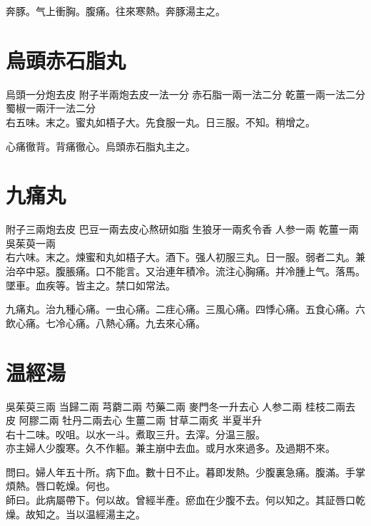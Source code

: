 奔豚。气上衝胸。腹痛。往來寒熱。奔豚湯主之。

\section{烏頭赤石脂丸}

烏頭{\scriptsize 一分炮去皮} 附子{\scriptsize 半兩炮去皮一法一分} 赤石脂{\scriptsize 一兩一法二分} 乾薑{\scriptsize 一兩一法二分} 蜀椒{\scriptsize 一兩汗一法二分}\\
右五味。末之。蜜丸如梧子大。先食服一丸。日三服。不知。稍增之。

心痛徹背。背痛徹心。烏頭赤石脂丸主之。

\section{九痛丸}

附子{\scriptsize 三兩炮去皮} 巴豆{\scriptsize 一兩去皮心熬研如脂} 生狼牙{\scriptsize 一兩炙令香} 人参{\scriptsize 一兩} 乾薑{\scriptsize 一兩} 吳茱萸{\scriptsize 一兩}\\
右六味。末之。煉蜜和丸如梧子大。酒下。强人初服三丸。日一服。弱者二丸。兼治卒中惡。腹脹痛。口不能言。又治連年積冷。流注心胸痛。并冷腫上气。落馬。墜車。血疾等。皆主之。禁口如常法。{\wuben}

{\dengben}%

九痛丸。治九種心痛。{\khaaitp 一虫心痛。二疰心痛。三風心痛。四悸心痛。五食心痛。六飲心痛。七冷心痛。八熱心痛。九去來心痛。}

\section{温經湯}

吳茱萸{\scriptsize 三兩} 当歸{\scriptsize 二兩} 芎藭{\scriptsize 二兩} 芍藥{\scriptsize 二兩} 麥門冬{\scriptsize 一升去心} 人参{\scriptsize 二兩} 桂枝{\scriptsize 二兩去皮} 阿膠{\scriptsize 二兩} 牡丹{\scriptsize 二兩去心} 生薑{\scriptsize 二兩} 甘草{\scriptsize 二兩炙} 半夏{\scriptsize 半升}\\
右十二味。㕮咀。以水一斗。煮取三升。去滓。分温三服。\\
亦主婦人少腹寒。久不作軀。兼主崩中去血。或月水來過多。及過期不來。

問曰。婦人年五十所。病下血。數十日不止。暮即发熱。少腹裏急{\khaaitp 痛}。腹滿。手掌煩熱。唇口乾燥。何也。\\
師曰。此病屬帶下。何以故。曾經半產。瘀血在少腹不去。何以知之。其証唇口乾燥。故知之。当以温經湯主之。

